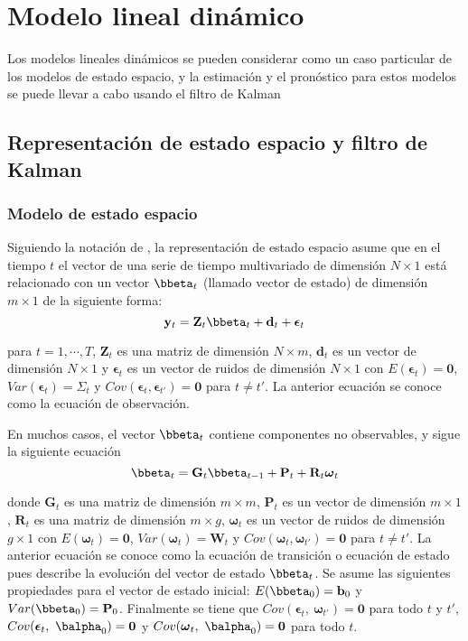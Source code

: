 
\chapter{Modelo lineal dinámico}

Los modelos lineales dinámicos se pueden considerar como un caso particular de los modelos de estado espacio, y la estimación y el pronóstico para estos modelos se puede llevar a cabo usando el filtro de Kalman

\section{Representación de estado espacio y filtro de Kalman}
\subsection{Modelo de estado espacio}
Siguiendo la notación de , la representación de estado espacio asume que en el tiempo $t$ el vector de una serie de tiempo multivariado de dimensión $N\times 1$ está relacionado con un vector $\bbeta_t$ (llamado vector de estado) de dimensión $m\times 1$ de la siguiente forma:
\begin{equation}\label{ec_obs}
\mathbf{y}_t=\mathbf{Z}_t\bbeta_t+\mathbf{d}_t+\boldsymbol{\epsilon}_t
\end{equation}

para $t=1,\cdots,T$, $\mathbf{Z}_t$ es una matriz de dimensión $N\times m$, $\mathbf{d}_t$ es un vector de dimensión $N\times 1$ y $\boldsymbol{\epsilon}_t$ es un vector de ruidos de dimensión $N\times 1$ con $E(\boldsymbol{\epsilon}_t)=\mathbf{0}$, $Var(\boldsymbol{\epsilon}_t)=\Sigma_t$ y $Cov(\boldsymbol{\epsilon}_t,\boldsymbol{\epsilon}_{t'})=\mathbf{0}$ para $t\neq t'$. La anterior ecuación se conoce como la ecuación de observación. 

En muchos casos, el vector $\bbeta_t$ contiene componentes no observables, y sigue la siguiente ecuación
\begin{equation}\label{ec_estado}
\bbeta_t=\mathbf{G}_t\bbeta_{t-1}+\mathbf{P}_t+\mathbf{R}_t\boldsymbol{\omega}_t
\end{equation}

donde $\mathbf{G}_t$ es una matriz de dimensión $m\times m$, $\mathbf{P}_t$ es un vector de dimensión $m\times 1$, $\mathbf{R}_t$ es una matriz de dimensión $m\times g$, $\boldsymbol{\omega}_t$ es un vector de ruidos de dimensión $g\times 1$ con $E(\boldsymbol{\omega}_t)=\mathbf{0}$, $Var(\boldsymbol{\omega}_t)=\mathbf{W}_t$ y $Cov(\boldsymbol{\omega}_t,\boldsymbol{\omega}_{t'})=\mathbf{0}$ para $t\neq t'$. La anterior ecuación se conoce como la ecuación de transición o ecuación de estado pues describe la evolución del vector de estado $\bbeta_t$. Se asume las siguientes propiedades para el vector de estado inicial: $E(\bbeta_0)=\mathbf{b}_0$ y $Var(\bbeta_0)=\mathbf{P}_0$. Finalmente se tiene que $Cov(\boldsymbol{\epsilon}_t,\ \boldsymbol{\omega}_{t'})=\mathbf{0}$ para todo $t$ y $t'$, $Cov(\boldsymbol{\epsilon}_t,\ \balpha_{0})=\mathbf{0}$ y $Cov(\boldsymbol{\omega}_t,\ \balpha_{0})=\mathbf{0}$  para todo $t$.

